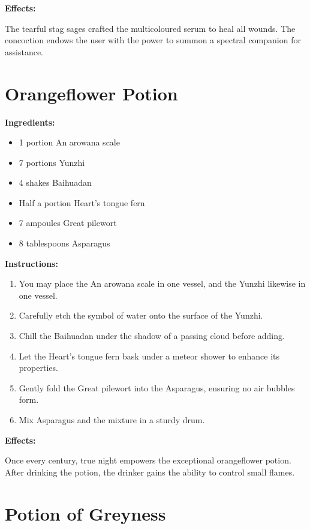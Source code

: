 \documentclass{article}
\begin{document}
\textbf{Effects:}

The tearful stag sages crafted the multicoloured serum to heal all wounds. The concoction endows the user with the power to summon a spectral companion for assistance.

\newpage
\section*{Orangeflower Potion}

\textbf{Ingredients:}

\begin{itemize}
  \item 1 portion An arowana scale
  \item 7 portions Yunzhi
  \item 4 shakes Baihuadan
  \item Half a portion Heart's tongue fern
  \item 7 ampoules Great pilewort
  \item 8 tablespoons Asparagus
\end{itemize}

\textbf{Instructions:}

\begin{enumerate}
  \item You may place the An arowana scale in one vessel, and the Yunzhi likewise in one vessel.
  \item Carefully etch the symbol of water onto the surface of the Yunzhi.
  \item Chill the Baihuadan under the shadow of a passing cloud before adding.
  \item Let the Heart's tongue fern bask under a meteor shower to enhance its properties.
  \item Gently fold the Great pilewort into the Asparagus, ensuring no air bubbles form.
  \item Mix Asparagus and the mixture in a sturdy drum.
\end{enumerate}

\textbf{Effects:}

Once every century, true night empowers the exceptional orangeflower potion. After drinking the potion, the drinker gains the ability to control small flames.

\newpage
\section*{Potion of Greyness}
\end{document}
